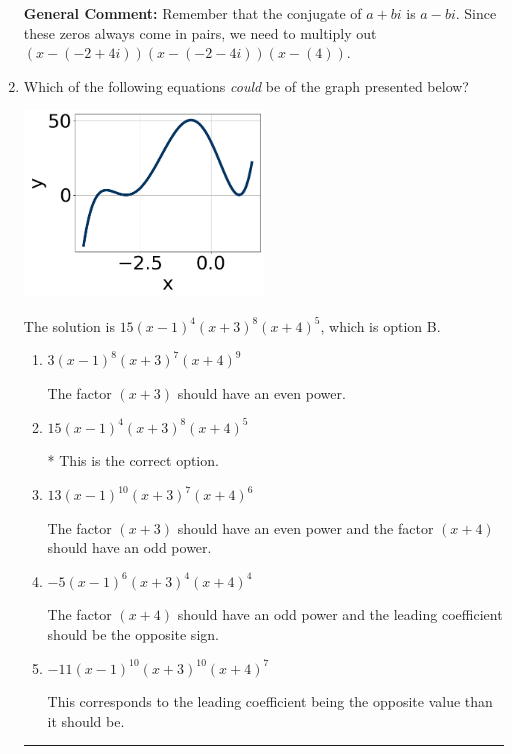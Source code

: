 \documentclass{extbook}[14pt]
\newcommand{\litem}[1]{\item #1

\rule{\textwidth}{0.4pt}}
\begin{document}
\begin{enumerate}
{\textbf{General Comment:} Remember that the conjugate of $a+bi$ is $a-bi$. Since these zeros always come in pairs, we need to multiply out $(x-(-2 + 4 i))(x-(-2 - 4 i))(x-(4))$.
}
\litem{
Which of the following equations \textit{could} be of the graph presented below?

\begin{center}
    \includegraphics[width=0.5\textwidth]{../Figures/polyGraphToFunctionCopyA.png}
\end{center}


The solution is \( 15(x - 1)^{4} (x + 3)^{8} (x + 4)^{5} \), which is option B.\begin{enumerate}[label=\Alph*.]
\item \( 3(x - 1)^{8} (x + 3)^{7} (x + 4)^{9} \)

The factor $(x + 3)$ should have an even power.
\item \( 15(x - 1)^{4} (x + 3)^{8} (x + 4)^{5} \)

* This is the correct option.
\item \( 13(x - 1)^{10} (x + 3)^{7} (x + 4)^{6} \)

The factor $(x + 3)$ should have an even power and the factor $(x + 4)$ should have an odd power.
\item \( -5(x - 1)^{6} (x + 3)^{4} (x + 4)^{4} \)

The factor $(x + 4)$ should have an odd power and the leading coefficient should be the opposite sign.
\item \( -11(x - 1)^{10} (x + 3)^{10} (x + 4)^{7} \)

This corresponds to the leading coefficient being the opposite value than it should be.
\end{enumerate}

}
\end{enumerate}
\end{document}
